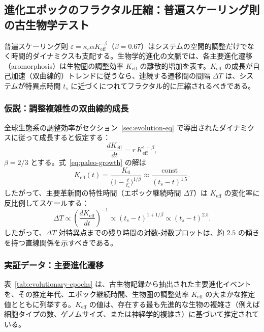 \documentclass[12pt,a4paper]{article}
\theoremstyle{remark}
\begin{document}
	\subsection{進化エポックのフラクタル圧縮：普遍スケーリング則の古生物学テスト}
	\label{subsec:paleo-scaling}
	
	普遍スケーリング則 \(\varepsilon = \kappa_c \alpha K_{\mathrm{eff}}^{-\beta}\)（\(\beta = 0.67\)）はシステムの空間的調整だけでなく時間的ダイナミクスも支配する。生物学的進化の文脈では、各主要進化遷移（aromorphosis）は生物圏の調整効率 \(K_{\mathrm{eff}}\) の離散的増加を表す。\(K_{\mathrm{eff}}\) の成長が自己加速（双曲線的）トレンドに従うなら、連続する遷移間の間隔 \(\Delta T\) は、システムが特異点時間 \(t_s\) に近づくにつれてフラクタル的に圧縮されるべきである。
	
	\subsubsection{仮説：調整複雑性の双曲線的成長}
	
	全球生態系の調整効率がセクション~\ref{sec:evolution-eq} で導出されたダイナミクスに従って成長すると仮定する：
	\begin{equation}
		\frac{dK_{\mathrm{eff}}}{dt} = r \, K_{\mathrm{eff}}^{1+\beta},
		\label{eq:paleo-growth}
	\end{equation}
	\(\beta = 2/3\) とする。式~\eqref{eq:paleo-growth} の解は
	\begin{equation}
		K_{\mathrm{eff}}(t) = \frac{K_0}{\bigl(1 - \frac{t}{t_s}\bigr)^{1/\beta}} \approx \frac{\text{const}}{(t_s - t)^{1.5}}.
		\label{eq:paleo-keff}
	\end{equation}
	したがって、主要革新間の特性時間（エポック継続時間 \(\Delta T\)）は \(K_{\mathrm{eff}}\) の変化率に反比例してスケールする：
	\begin{equation}
		\Delta T \propto \left( \frac{dK_{\mathrm{eff}}}{dt} \right)^{-1} \propto (t_s - t)^{1 + 1/\beta} \propto (t_s - t)^{2.5}.
		\label{eq:paleo-dT}
	\end{equation}
	したがって、\(\Delta T\) 対特異点までの残り時間の対数‐対数プロットは、約 \(2.5\) の傾きを持つ直線関係を示すべきである。
	
	\subsubsection{実証データ：主要進化遷移}
	
	表~\ref{tab:evolutionary-epochs} は、古生物記録から抽出された主要進化イベントを、その推定年代、エポック継続時間、生物圏の調整効率 \(K_{\mathrm{eff}}\) の大まかな推定値とともに列挙する。\(K_{\mathrm{eff}}\) の値は、存在する最も先進的な生物の複雑さ（例えば細胞タイプの数、ゲノムサイズ、または神経学的複雑さ）に基づいて推定されている。
	
\end{document}
